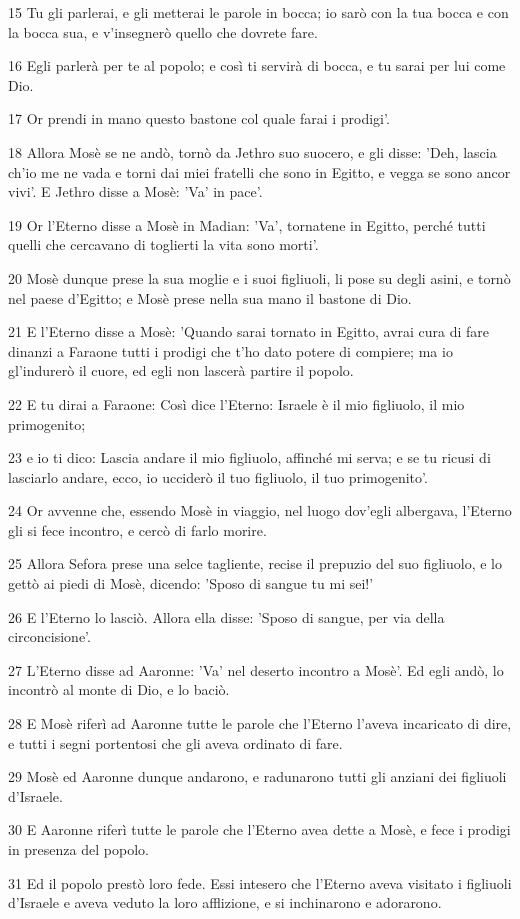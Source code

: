 \par 15 Tu gli parlerai, e gli metterai le parole in bocca; io sarò con la tua bocca e con la bocca sua, e v'insegnerò quello che dovrete fare.
\par 16 Egli parlerà per te al popolo; e così ti servirà di bocca, e tu sarai per lui come Dio.
\par 17 Or prendi in mano questo bastone col quale farai i prodigi'.
\par 18 Allora Mosè se ne andò, tornò da Jethro suo suocero, e gli disse: 'Deh, lascia ch'io me ne vada e torni dai miei fratelli che sono in Egitto, e vegga se sono ancor vivi'. E Jethro disse a Mosè: 'Va' in pace'.
\par 19 Or l'Eterno disse a Mosè in Madian: 'Va', tornatene in Egitto, perché tutti quelli che cercavano di toglierti la vita sono morti'.
\par 20 Mosè dunque prese la sua moglie e i suoi figliuoli, li pose su degli asini, e tornò nel paese d'Egitto; e Mosè prese nella sua mano il bastone di Dio.
\par 21 E l'Eterno disse a Mosè: 'Quando sarai tornato in Egitto, avrai cura di fare dinanzi a Faraone tutti i prodigi che t'ho dato potere di compiere; ma io gl'indurerò il cuore, ed egli non lascerà partire il popolo.
\par 22 E tu dirai a Faraone: Così dice l'Eterno: Israele è il mio figliuolo, il mio primogenito;
\par 23 e io ti dico: Lascia andare il mio figliuolo, affinché mi serva; e se tu ricusi di lasciarlo andare, ecco, io ucciderò il tuo figliuolo, il tuo primogenito'.
\par 24 Or avvenne che, essendo Mosè in viaggio, nel luogo dov'egli albergava, l'Eterno gli si fece incontro, e cercò di farlo morire.
\par 25 Allora Sefora prese una selce tagliente, recise il prepuzio del suo figliuolo, e lo gettò ai piedi di Mosè, dicendo: 'Sposo di sangue tu mi sei!'
\par 26 E l'Eterno lo lasciò. Allora ella disse: 'Sposo di sangue, per via della circoncisione'.
\par 27 L'Eterno disse ad Aaronne: 'Va' nel deserto incontro a Mosè'. Ed egli andò, lo incontrò al monte di Dio, e lo baciò.
\par 28 E Mosè riferì ad Aaronne tutte le parole che l'Eterno l'aveva incaricato di dire, e tutti i segni portentosi che gli aveva ordinato di fare.
\par 29 Mosè ed Aaronne dunque andarono, e radunarono tutti gli anziani dei figliuoli d'Israele.
\par 30 E Aaronne riferì tutte le parole che l'Eterno avea dette a Mosè, e fece i prodigi in presenza del popolo.
\par 31 Ed il popolo prestò loro fede. Essi intesero che l'Eterno aveva visitato i figliuoli d'Israele e aveva veduto la loro afflizione, e si inchinarono e adorarono.

